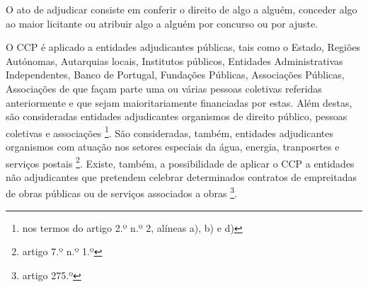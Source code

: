 O ato de adjudicar consiste em conferir o direito de algo a alguém, conceder algo ao maior licitante ou atribuir algo a alguém por concurso ou por ajuste. 

O CCP é aplicado a entidades adjudicantes públicas, tais como o Estado, Regiões Autónomas, Autarquias locais, Institutos públicos, Entidades Administrativas Independentes, Banco de Portugal, Fundações Públicas, Associações Públicas, Associações de que façam parte uma ou várias pessoas coletivas referidas anteriormente e que sejam maioritariamente financiadas por estas. Além destas, são consideradas entidades adjudicantes organismos de direito público, pessoas coletivas e associações \footnote{nos termos do artigo 2.º n.º 2, alíneas a), b) e d)}. São consideradas, também, entidades adjudicantes organismos com atuação nos setores especiais da água, energia, tranposrtes e serviços postais \footnote{artigo 7.º n.º 1.º}. Existe, também, a possibilidade de aplicar o CCP a entidades não adjudicantes que pretendem celebrar determinados contratos de empreitadas de obras públicas ou de serviços associados a obras \footnote{artigo 275.º}.








